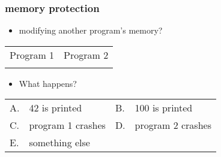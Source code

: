\begin{frame}
\frametitle{memory protection}
\begin{itemize}
\item modifying another program's memory?
\end{itemize}
\lstset{language=C++,style=small}
\begin{tabular}{l|l}
Program 1 & Program 2 \\
 &
 \\ \hline
\end{tabular}
\begin{itemize}
\item What happens?
\end{itemize}
\begin{tabular}{llll}
A. & 42 is printed & B. & 100 is printed \\
C. & program 1 crashes & D. & program 2 crashes \\
E. & something else & ~ & ~ \\
\end{tabular}
\end{frame}
